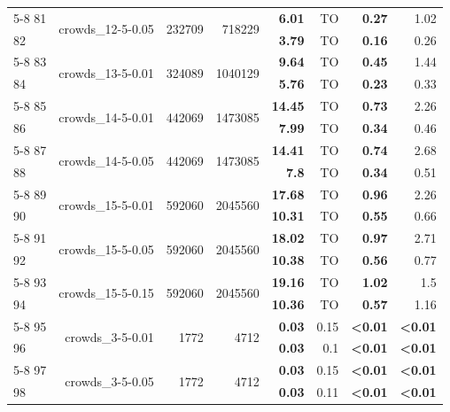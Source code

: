 \begin{longtable}{lrr@{\hskip 12pt}r@{\hskip 12pt}r@{\hskip 12pt}r@{\hskip 12pt}r@{\hskip 12pt}r}
\cmidrule{5-8}
81 & \multirow{2}{*}{crowds\_12-5-0.05} & \multirow{2}{*}{232709} & \multirow{2}{*}{718229} & \textbf{6.01} & TO & \textbf{0.27} & 1.02 \\
82 &  &  &  & \textbf{3.79} & TO & \textbf{0.16} & 0.26 \\
\cmidrule{5-8}
83 & \multirow{2}{*}{crowds\_13-5-0.01} & \multirow{2}{*}{324089} & \multirow{2}{*}{1040129} & \textbf{9.64} & TO & \textbf{0.45} & 1.44 \\
84 &  &  &  & \textbf{5.76} & TO & \textbf{0.23} & 0.33 \\
\cmidrule{5-8}
85 & \multirow{2}{*}{crowds\_14-5-0.01} & \multirow{2}{*}{442069} & \multirow{2}{*}{1473085} & \textbf{14.45} & TO & \textbf{0.73} & 2.26 \\
86 &  &  &  & \textbf{7.99} & TO & \textbf{0.34} & 0.46 \\
\cmidrule{5-8}
87 & \multirow{2}{*}{crowds\_14-5-0.05} & \multirow{2}{*}{442069} & \multirow{2}{*}{1473085} & \textbf{14.41} & TO & \textbf{0.74} & 2.68 \\
88 &  &  &  & \textbf{7.8} & TO & \textbf{0.34} & 0.51 \\
\cmidrule{5-8}
89 & \multirow{2}{*}{crowds\_15-5-0.01} & \multirow{2}{*}{592060} & \multirow{2}{*}{2045560} & \textbf{17.68} & TO & \textbf{0.96} & 2.26 \\
90 &  &  &  & \textbf{10.31} & TO & \textbf{0.55} & 0.66 \\
\cmidrule{5-8}
91 & \multirow{2}{*}{crowds\_15-5-0.05} & \multirow{2}{*}{592060} & \multirow{2}{*}{2045560} & \textbf{18.02} & TO & \textbf{0.97} & 2.71 \\
92 &  &  &  & \textbf{10.38} & TO & \textbf{0.56} & 0.77 \\
\cmidrule{5-8}
93 & \multirow{2}{*}{crowds\_15-5-0.15} & \multirow{2}{*}{592060} & \multirow{2}{*}{2045560} & \textbf{19.16} & TO & \textbf{1.02} & 1.5 \\
94 &  &  &  & \textbf{10.36} & TO & \textbf{0.57} & 1.16 \\
\cmidrule{5-8}
95 & \multirow{2}{*}{crowds\_3-5-0.01} & \multirow{2}{*}{1772} & \multirow{2}{*}{4712} & \textbf{0.03} & 0.15 & \textbf{<0.01} & \textbf{<0.01} \\
96 &  &  &  & \textbf{0.03} & 0.1 & \textbf{<0.01} & \textbf{<0.01} \\
\cmidrule{5-8}
97 & \multirow{2}{*}{crowds\_3-5-0.05} & \multirow{2}{*}{1772} & \multirow{2}{*}{4712} & \textbf{0.03} & 0.15 & \textbf{<0.01} & \textbf{<0.01} \\
98 &  &  &  & \textbf{0.03} & 0.11 & \textbf{<0.01} & \textbf{<0.01} \\

\end{longtable}
